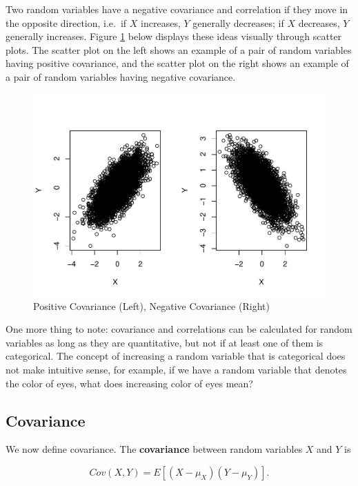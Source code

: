 \documentclass[
]{book}
\begin{document}
Two random variables have a negative covariance and correlation if they move in the opposite direction, i.e.~if \(X\) increases, \(Y\) generally decreases; if \(X\) decreases, \(Y\) generally increases. Figure \ref{fig:5-covs} below displays these ideas visually through scatter plots. The scatter plot on the left shows an example of a pair of random variables having positive covariance, and the scatter plot on the right shows an example of a pair of random variables having negative covariance.

\begin{figure}
\centering
\includegraphics{bookdown-demo_files/figure-latex/5-covs-1.pdf}
\caption{\label{fig:5-covs}Positive Covariance (Left), Negative Covariance (Right)}
\end{figure}

One more thing to note: covariance and correlations can be calculated for random variables as long as they are quantitative, but not if at least one of them is categorical. The concept of increasing a random variable that is categorical does not make intuitive sense, for example, if we have a random variable that denotes the color of eyes, what does increasing color of eyes mean?

\subsection{Covariance}\label{5-cov}

We now define covariance. The \textbf{covariance} between random variables \(X\) and \(Y\) is

\begin{equation} 
Cov(X,Y) = E\left[(X- \mu_X)(Y - \mu_Y) \right].
\label{eq:5-cov}
\end{equation}
\end{document}
